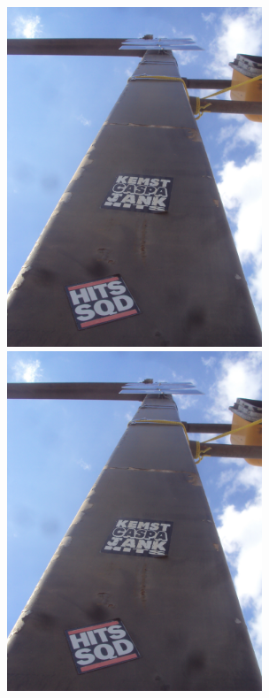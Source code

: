 \documentclass[10pt,letterpaper]{article}
\begin{document}
\includegraphics[height=4in]{portrait.jpg}
\includegraphics[height=4in]{portrait.jpg}
\end{document}
